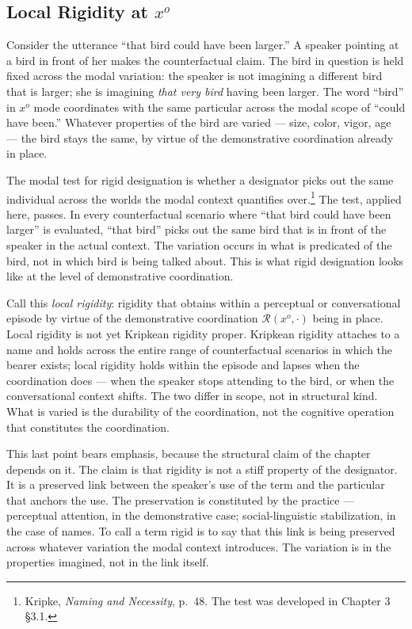 \documentclass[12pt,a4paper]{article}
\begin{document}
\subsection{\texorpdfstring{Local Rigidity at \(x^o\)}{Local Rigidity at x\^{}o}}\label{local-rigidity-at-xo}

Consider the utterance ``that bird could have been larger.'' A speaker pointing at a bird in front of her makes the counterfactual claim. The bird in question is held fixed across the modal variation: the speaker is not imagining a different bird that is larger; she is imagining \emph{that very bird} having been larger. The word ``bird'' in \(x^o\) mode coordinates with the same particular across the modal scope of ``could have been.'' Whatever properties of the bird are varied --- size, color, vigor, age --- the bird stays the same, by virtue of the demonstrative coordination already in place.

The modal test for rigid designation is whether a designator picks out the same individual across the worlds the modal context quantifies over.\footnote{Kripke, \emph{Naming and Necessity}, p.~48. The test was developed in Chapter 3 §3.1.} The test, applied here, passes. In every counterfactual scenario where ``that bird could have been larger'' is evaluated, ``that bird'' picks out the same bird that is in front of the speaker in the actual context. The variation occurs in what is predicated of the bird, not in which bird is being talked about. This is what rigid designation looks like at the level of demonstrative coordination.

Call this \emph{local rigidity}: rigidity that obtains within a perceptual or conversational episode by virtue of the demonstrative coordination \(\mathcal{R}(x^o, \cdot)\) being in place. Local rigidity is not yet Kripkean rigidity proper. Kripkean rigidity attaches to a name and holds across the entire range of counterfactual scenarios in which the bearer exists; local rigidity holds within the episode and lapses when the coordination does --- when the speaker stops attending to the bird, or when the conversational context shifts. The two differ in scope, not in structural kind. What is varied is the durability of the coordination, not the cognitive operation that constitutes the coordination.

This last point bears emphasis, because the structural claim of the chapter depends on it. The claim is that rigidity is not a stiff property of the designator. It is a preserved link between the speaker's use of the term and the particular that anchors the use. The preservation is constituted by the practice --- perceptual attention, in the demonstrative case; social-linguistic stabilization, in the case of names. To call a term rigid is to say that this link is being preserved across whatever variation the modal context introduces. The variation is in the properties imagined, not in the link itself.
\end{document}
